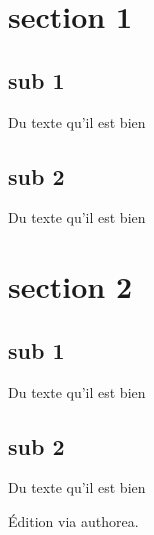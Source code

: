 
\section{section 1}
\subsection{sub 1}

Du texte qu'il est bien \cite{zander2011}

\subsection{sub 2}

Du texte qu'il est bien

\section{section 2}

\subsection{sub 1}

Du texte qu'il est bien

\subsection{sub 2}

Du texte qu'il est bien

Édition via authorea.

